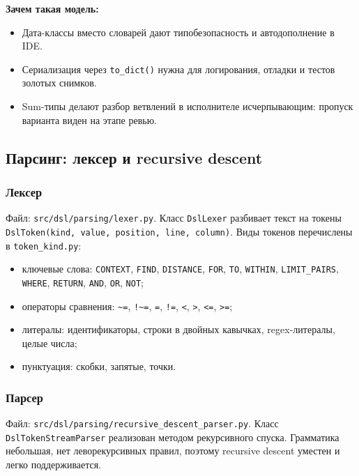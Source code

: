 \documentclass[12pt,a4paper]{article}
\newcommand{\code}[1]{\texttt{#1}}
\begin{document}
\textbf{Зачем такая модель:}

\begin{itemize}
  \item Дата-классы вместо словарей дают типобезопасность и
        автодополнение в IDE.
  \item Сериализация через \code{to\_dict()} нужна для логирования,
        отладки и тестов золотых снимков.
  \item Sum-типы делают разбор ветвлений в исполнителе исчерпывающим:
        пропуск варианта виден на этапе ревью.
\end{itemize}

\subsection{Парсинг: лексер и recursive descent}

\subsubsection{Лексер}

Файл: \code{src/dsl/parsing/lexer.py}. Класс \code{DslLexer} разбивает
текст на токены \code{DslToken(kind, value, position, line, column)}.
Виды токенов перечислены в \code{token\_kind.py}:

\begin{itemize}
  \item ключевые слова: \code{CONTEXT}, \code{FIND}, \code{DISTANCE},
        \code{FOR}, \code{TO}, \code{WITHIN}, \code{LIMIT\_PAIRS},
        \code{WHERE}, \code{RETURN}, \code{AND}, \code{OR}, \code{NOT};
  \item операторы сравнения: \code{\textasciitilde =},
        \code{!\textasciitilde =}, \code{=}, \code{!=}, \code{<},
        \code{>}, \code{<=}, \code{>=};
  \item литералы: идентификаторы, строки в двойных кавычках,
        regex-литералы, целые числа;
  \item пунктуация: скобки, запятые, точки.
\end{itemize}

\subsubsection{Парсер}

Файл: \code{src/dsl/parsing/recursive\_descent\_parser.py}. Класс
\code{DslTokenStreamParser} реализован методом рекурсивного спуска.
Грамматика небольшая, нет леворекурсивных правил, поэтому recursive
descent уместен и легко поддерживается.
\end{document}
